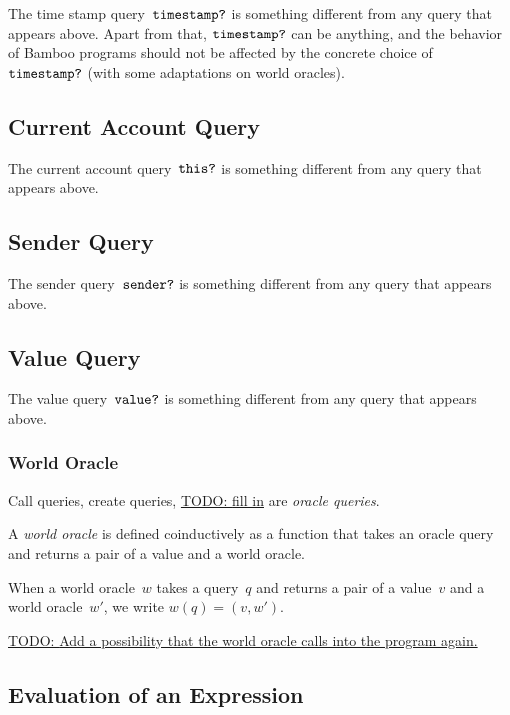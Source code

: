 \documentclass{book}
\newcommand{\todo}[1]{\underline{TODO: {#1}}}
\begin{document}
\newcommand{\timestampQuery}{\text{\texttt{timestamp?}}}
The time stamp query~$\timestampQuery$ is something different from any query that appears above. Apart from that, $\timestampQuery$ can be anything, and the behavior of Bamboo programs should not be affected by the concrete choice of $\timestampQuery$ (with some adaptations on world oracles).

\subsection{Current Account Query}

\newcommand{\thisQuery}[0]{\text{\texttt{this?}}}

The current account query~$\thisQuery$ is something different from any query that appears above.

\subsection{Sender Query}

\newcommand{\senderQuery}{\text{\texttt{sender?}}}

The sender query~$\senderQuery$ is something different from any query that appears above.

\subsection{Value Query}

\newcommand{\valueQuery}{\text{\texttt{value?}}}

The value query~$\valueQuery$ is something different from any query that appears above.

\subsubsection{World Oracle}

Call queries, create queries, \todo{fill in} are \textit{oracle queries}.

A \textit{world oracle} is defined coinductively as a function that takes an oracle query and returns a pair of a value and a world oracle.

When a world oracle~$w$ takes a query~$q$ and returns a pair of a value~$v$ and a world oracle~$w'$, we write $w(q) = (v, w')$.

\todo{Add a possibility that the world oracle calls into the program again.}

\subsection{Evaluation of an Expression}
\end{document}
